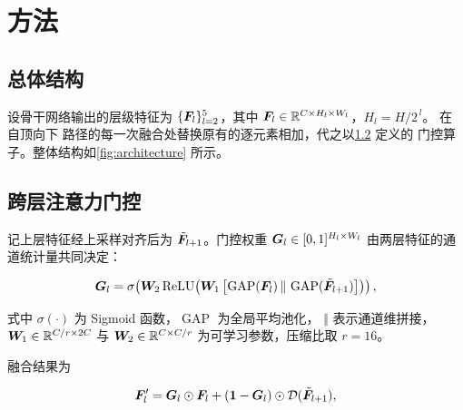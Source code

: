 \section{方法}
\label{sec:method}

\subsection{总体结构}
\label{sec:method:overview}

设骨干网络输出的层级特征为 $\{\bm{F}_l\}_{l=2}^{5}$，其中 $\bm{F}_l \in
\mathbb{R}^{C \times H_l \times W_l}$，$H_l = H/2^{\,l}$。\ourmethod{} 在自顶向下
路径的每一次融合处替换原有的逐元素相加，代之以\cref{sec:method:gate} 定义的
门控算子。整体结构如\cref{fig:architecture} 所示。

\subsection{跨层注意力门控}
\label{sec:method:gate}

记上层特征经上采样对齐后为 $\tilde{\bm{F}}_{l+1}$。门控权重
$\bm{G}_l \in [0,1]^{H_l \times W_l}$ 由两层特征的通道统计量共同决定：

\begin{equation}
  \label{eq:gate}
  \bm{G}_l = \sigma\!\left(
    \bm{W}_2 \operatorname{ReLU}\!\left(
      \bm{W}_1 \left[ \operatorname{GAP}(\bm{F}_l) \,\Vert\,
                       \operatorname{GAP}(\tilde{\bm{F}}_{l+1}) \right]
    \right)
  \right),
\end{equation}

式中 $\sigma(\cdot)$ 为 Sigmoid 函数，$\operatorname{GAP}$ 为全局平均池化，
$\Vert$ 表示通道维拼接，$\bm{W}_1 \in \mathbb{R}^{C/r \times 2C}$ 与
$\bm{W}_2 \in \mathbb{R}^{C \times C/r}$ 为可学习参数，压缩比取 $r = 16$。

融合结果为

\begin{equation}
  \label{eq:fusion}
  \bm{F}_l' = \bm{G}_l \odot \bm{F}_l
              + (\mathbf{1} - \bm{G}_l) \odot \mathcal{D}(\tilde{\bm{F}}_{l+1}),
\end{equation}

